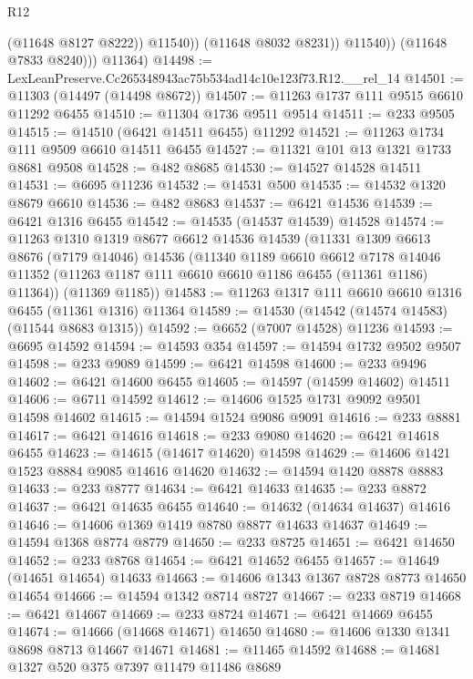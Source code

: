 \begin{lexlean}{R12}
\begin{coremodule}
                      (@11648 @8127 @8222))
                    @11540))
                (@11648 @8032 @8231))
              @11540))
          (@11648 @7833 @8240)))
      @11364)
@14498 := LexLeanPreserve.Cc265348943ac75b534ad14c10e123f73.R12.__rel_14
@14501 := @11303 (@14497 (@14498 @8672))
@14507 := @11263 @1737 @111 @9515 @6610 @11292 @6455
@14510 := @11304 @1736 @9511 @9514
@14511 := @233 @9505
@14515 := @14510 (@6421 @14511 @6455) @11292
@14521 := @11263 @1734 @111 @9509 @6610 @14511 @6455
@14527 := @11321 @101 @13 @1321 @1733 @8681 @9508
@14528 := @482 @8685
@14530 := @14527 @14528 @14511
@14531 := @6695 @11236
@14532 := @14531 @500
@14535 := @14532 @1320 @8679 @6610
@14536 := @482 @8683
@14537 := @6421 @14536
@14539 := @6421 @1316 @6455
@14542 := @14535 (@14537 @14539) @14528
@14574 := @11263
    @1310
    @1319
    @8677
    @6612
    @14536
    @14539
    (@11331
      @1309
      @6613
      @8676
      (@7179 @14046)
      @14536
      (@11340
        @1189
        @6610
        @6612
        @7178
        @14046
        @11352
        (@11263 @1187 @111 @6610 @6610 @1186 @6455 (@11361 @1186) @11364))
      (@11369 @1185))
@14583 := @11263 @1317 @111 @6610 @6610 @1316 @6455 (@11361 @1316) @11364
@14589 := @14530 (@14542 (@14574 @14583) (@11544 @8683 @1315))
@14592 := @6652 (@7007 @14528) @11236
@14593 := @6695 @14592
@14594 := @14593 @354
@14597 := @14594 @1732 @9502 @9507
@14598 := @233 @9089
@14599 := @6421 @14598
@14600 := @233 @9496
@14602 := @6421 @14600 @6455
@14605 := @14597 (@14599 @14602) @14511
@14606 := @6711 @14592
@14612 := @14606 @1525 @1731 @9092 @9501 @14598 @14602
@14615 := @14594 @1524 @9086 @9091
@14616 := @233 @8881
@14617 := @6421 @14616
@14618 := @233 @9080
@14620 := @6421 @14618 @6455
@14623 := @14615 (@14617 @14620) @14598
@14629 := @14606 @1421 @1523 @8884 @9085 @14616 @14620
@14632 := @14594 @1420 @8878 @8883
@14633 := @233 @8777
@14634 := @6421 @14633
@14635 := @233 @8872
@14637 := @6421 @14635 @6455
@14640 := @14632 (@14634 @14637) @14616
@14646 := @14606 @1369 @1419 @8780 @8877 @14633 @14637
@14649 := @14594 @1368 @8774 @8779
@14650 := @233 @8725
@14651 := @6421 @14650
@14652 := @233 @8768
@14654 := @6421 @14652 @6455
@14657 := @14649 (@14651 @14654) @14633
@14663 := @14606 @1343 @1367 @8728 @8773 @14650 @14654
@14666 := @14594 @1342 @8714 @8727
@14667 := @233 @8719
@14668 := @6421 @14667
@14669 := @233 @8724
@14671 := @6421 @14669 @6455
@14674 := @14666 (@14668 @14671) @14650
@14680 := @14606 @1330 @1341 @8698 @8713 @14667 @14671
@14681 := @11465 @14592
@14688 := @14681 @1327 @520 @375 @7397 @11479 @11486 @8689

\end{coremodule}
\end{lexlean}
